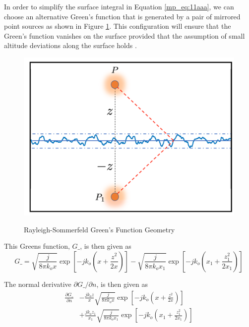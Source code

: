 In order to simplify the surface integral in Equation \ref{mp_eq:11aaa}, we can choose an alternative Green's function that is generated by a pair of mirrored point sources as shown in Figure \ref{mp_fig:2a}. This configuration will ensure that the Green's function vanishes on the surface provided that the assumption of small altitude deviations along the surface holds \cite{goodman_fourier}.

\begin{figure}[H]
  \begin{center}
\includegraphics[width=5in]{../media/analysis/rayleigh_sommerfeld_gf_geometry.png}
  \end{center}
  \renewcommand{\baselinestretch}{1} \small\normalsize
  \begin{quote}
    \caption[Rayleigh-Sommerfeld Green's Function Geometry]{Rayleigh-Sommerfeld Green's Function Geometry\label{mp_fig:2a}}
  \end{quote}
\end{figure}
\renewcommand{\baselinestretch}{2} \small\normalsize

\noindent This Greens function, $G\_$, is then given as
\begin{equation}
G\_= \sqrt{\frac{j}{8\pi k_ox}}\exp\left[-jk_o\left(x + \frac{z^2}{2x}\right) \right] - \sqrt{\frac{j}{8\pi k_ox_1}}\exp\left[-jk_o\left(x_1 + \frac{z_1^2}{2x_1}\right) \right]
\label{mp_eq:11aab}
\end{equation}
\renewcommand{\baselinestretch}{2} \small\normalsize

\noindent The normal derivative $\partial G\_/\partial n$, is then given as
\begin{equation}
\begin{aligned}
\frac{\partial G\_}{\partial n}&-\frac{jk_oz}{x}\sqrt{\frac{j}{8\pi k_ox}}\exp\left[-jk_o\left(x + \frac{z^2}{2x}\right) \right] \\
&+\frac{jk_oz_1}{x_1}\sqrt{\frac{j}{8\pi k_ox_1}}\exp\left[-jk_o\left(x_1 + \frac{z_1^2}{2x_1}\right) \right]
\end{aligned}
\label{mp_eq:11aac}
\end{equation}
\renewcommand{\baselinestretch}{2} \small\normalsize

